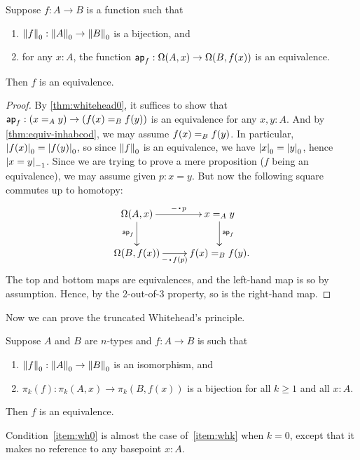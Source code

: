 \begin{cor}\label{thm:whitehead1}
  Suppose $f:A\to B$ is a function such that
  \begin{enumerate}
  \item $\trunc0 f : \trunc0 A \to \trunc0 B$ is a bijection, and
  \item for any $x:A$, the function $\apfunc f : \Omega(A,x) \to \Omega(B,f(x))$ is an equivalence.
  \end{enumerate}
  Then $f$ is an equivalence.
\end{cor}
\begin{proof}
  By \autoref{thm:whitehead0}, it suffices to show that $\apfunc f : (\id[A]xy) \to (\id[B]{f(x)}{f(y)})$ is an equivalence for any $x,y:A$.
  And by \autoref{thm:equiv-inhabcod}, we may assume $\id[B]{f(x)}{f(y)}$.
  In particular, $\tproj0{f(x)} = \tproj0{f(y)}$, so since $\trunc0 f$ is an equivalence, we have $\tproj0 x = \tproj0y$, hence $\tproj{-1}{x=y}$.
  Since we are trying to prove a mere proposition ($f$ being an equivalence), we may assume given $p:x=y$.
  But now the following square commutes up to homotopy:
  \begin{equation*}
  \vcenter{\xymatrix{
      \Omega(A,x)\ar[r]^-{-\ct p}\ar[d]_{\apfunc f} &
      \id[A]xy \ar[d]^{\apfunc f}\\
      \Omega(B,f(x))\ar[r]_-{-\ct f(p)} &
      \id[B]{f(x)}{f(y)}.
      }}
  \end{equation*}
  The top and bottom maps are equivalences, and the left-hand map is so by assumption.
  Hence, by the 2-out-of-3 property, so is the right-hand map.
\end{proof}

Now we can prove the truncated Whitehead's principle.

\begin{thm}\label{thm:whiteheadn}
  Suppose $A$ and $B$ are $n$-types and $f:A\to B$ is such that
  \begin{enumerate}
  \item $\trunc0f:\trunc0A \to \trunc0B$ is an isomorphism, and\label{item:wh0}
  \item $\pi_k(f):\pi_k(A,x) \to \pi_k(B,f(x))$ is a bijection for all $k\ge 1$ and all $x:A$.\label{item:whk}
  \end{enumerate}
  Then $f$ is an equivalence.
\end{thm}

\noindent
Condition~\ref{item:wh0} is almost the case of~\ref{item:whk} when $k=0$, except that it makes no reference to any basepoint $x:A$.

